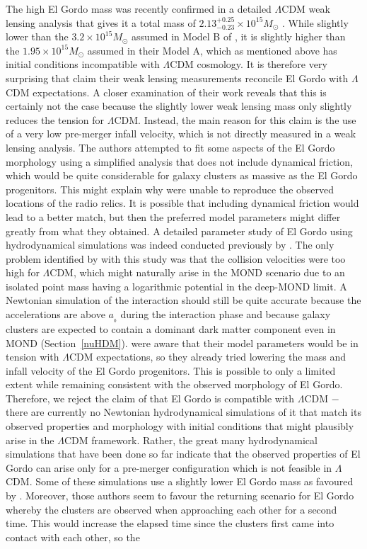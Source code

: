 \documentclass[fleqn,usenatbib,useAMS,onecolumn]{mnras} %
\begin{document}
The high El Gordo mass was recently confirmed in a detailed $\Lambda$CDM weak lensing analysis that gives it a total mass of $2.13^{+0.25}_{-0.23} \times 10^{15} M_\odot$ \citep{Kim_2021_El_Gordo}. While slightly lower than the $3.2 \times 10^{15} M_\odot$ assumed in Model B of \citet{Zhang_2015}, it is slightly higher than the $1.95 \times 10^{15} M_\odot$ assumed in their Model A, which as mentioned above has initial conditions incompatible with $\Lambda$CDM cosmology. It is therefore very surprising that \citet{Kim_2021_El_Gordo} claim their weak lensing measurements reconcile El Gordo with $\Lambda$CDM expectations. A closer examination of their work reveals that this is certainly not the case because the slightly lower weak lensing mass only slightly reduces the tension for $\Lambda$CDM. Instead, the main reason for this claim is the use of a very low pre-merger infall velocity, which is not directly measured in a weak lensing analysis. The authors attempted to fit some aspects of the El Gordo morphology using a simplified analysis that does not include dynamical friction, which would be quite considerable for galaxy clusters as massive as the El Gordo progenitors. This might explain why \citet{Kim_2021_El_Gordo} were unable to reproduce the observed locations of the radio relics. It is possible that including dynamical friction would lead to a better match, but then the preferred model parameters might differ greatly from what they obtained. A detailed parameter study of El Gordo using hydrodynamical simulations was indeed conducted previously by \citet{Zhang_2015}. The only problem identified by \citet{Kim_2021_El_Gordo} with this study was that the collision velocities were too high for $\Lambda$CDM, which might naturally arise in the MOND scenario due to an isolated point mass having a logarithmic potential in the deep-MOND limit. A Newtonian simulation of the interaction should still be quite accurate because the accelerations are above $a_{_0}$ during the interaction phase and because galaxy clusters are expected to contain a dominant dark matter component even in MOND (Section~\ref{nuHDM}). \citet{Zhang_2015} were aware that their model parameters would be in tension with $\Lambda$CDM expectations, so they already tried lowering the mass and infall velocity of the El Gordo progenitors. This is possible to only a limited extent while remaining consistent with the observed morphology of El Gordo. Therefore, we reject the claim of \citet{Kim_2021_El_Gordo} that El Gordo is compatible with $\Lambda$CDM $-$ there are currently no Newtonian hydrodynamical simulations of it that match its observed properties and morphology with initial conditions that might plausibly arise in the $\Lambda$CDM framework. Rather, the great many hydrodynamical simulations that have been done so far indicate that the observed properties of El Gordo can arise only for a pre-merger configuration which is not feasible in $\Lambda$CDM. Some of these simulations use a slightly lower El Gordo mass as favoured by \citet{Kim_2021_El_Gordo}. Moreover, those authors seem to favour the returning scenario for El Gordo whereby the clusters are observed when approaching each other for a second time. This would increase the elapsed time since the clusters first came into contact with each other, so the 
\end{document}
